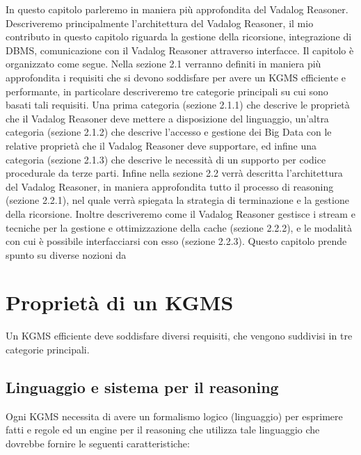 In questo capitolo parleremo in maniera più approfondita del Vadalog Reasoner. Descriveremo principalmente l'architettura del Vadalog Reasoner, il mio contributo in questo capitolo riguarda la gestione della ricorsione, integrazione di DBMS, comunicazione con il Vadalog Reasoner attraverso interfacce. \newline
Il capitolo è organizzato come segue. Nella sezione 2.1 verranno definiti in maniera più approfondita i requisiti che si devono soddisfare per avere un KGMS efficiente e performante, in particolare descriveremo tre categorie principali su cui sono basati tali requisiti. Una prima categoria (sezione 2.1.1) che descrive le proprietà che il Vadalog Reasoner deve mettere a disposizione del linguaggio, un'altra categoria (sezione 2.1.2) che descrive l'accesso e gestione dei Big Data con le relative proprietà che il Vadalog Reasoner deve supportare, ed infine una categoria (sezione 2.1.3) che descrive le necessità di un supporto per codice procedurale da terze parti. \newline
Infine nella sezione 2.2 verrà descritta l'architettura del Vadalog Reasoner, in maniera approfondita tutto il processo di reasoning (sezione 2.2.1), nel quale verrà spiegata la strategia di terminazione e la gestione della ricorsione. Inoltre descriveremo come il Vadalog Reasoner gestisce i stream e tecniche per la gestione e ottimizzazione della cache (sezione 2.2.2), e le modalità con cui è possibile interfacciarsi con esso (sezione 2.2.3).
Questo capitolo prende spunto su diverse nozioni da~\cite{bellomarini2017swift}

\section{Proprietà di un KGMS}

Un KGMS efficiente deve soddisfare diversi requisiti, che vengono suddivisi in tre categorie principali.

\subsection{Linguaggio e sistema per il reasoning}

Ogni KGMS necessita di avere un formalismo logico (linguaggio) per esprimere fatti e regole ed un engine per il reasoning che utilizza tale linguaggio che dovrebbe fornire le seguenti caratteristiche:

